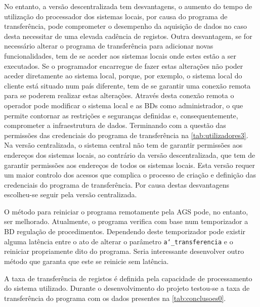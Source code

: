 \documentclass[11pt,twoside,a4paper]{report}
\begin{document}
No entanto, a versão descentralizada tem desvantagens, o aumento do tempo de utilização do processador dos sistemas locais, por causa do programa de transferência, pode comprometer o desempenho da aquisição de dados no caso desta necessitar de uma elevada cadência de registos. Outra desvantagem, se for necessário alterar o programa de transferência para adicionar novas funcionalidades, tem de se aceder aos sistemas locais onde estes estão a ser executados. Se o programador encarregue de fazer estas alterações não poder aceder diretamente ao sistema local, porque, por exemplo, o sistema local do cliente está situado num país diferente, tem de se garantir uma conexão remota para se poderem realizar estas alterações. Através desta conexão remota o operador pode modificar o sistema local e as BDs como administrador, o que permite contornar as restrições e seguranças definidas e, consequentemente, comprometer a infraestrutura de dados. Terminando com a questão das permissões das credenciais do programa de transferência na \autoref{tab:utilizadores3}. Na versão centralizada, o sistema central não tem de garantir permissões aos endereços dos sistemas locais, ao contrário da versão descentralizada, que tem de garantir permissões aos endereços de todos os sistemas locais. Esta versão requer um maior controlo dos acessos que complica o processo de criação e definição das credenciais do programa de transferência. Por causa destas desvantagens escolheu-se seguir pela versão centralizada.\par 
O método para reiniciar o programa remotamente pela AGS pode, no entanto, ser melhorado. Atualmente, o programa verifica com base num temporizador a BD regulação de procedimentos. Dependendo deste temporizador pode existir alguma latência entre o ato de alterar o parâmetro \texttt{a\char`_transferencia} e o reiniciar propriamente dito do programa. Seria interessante desenvolver outro método que garanta que este se reinicie sem latência.\par 
A taxa de transferência de registos é definida pela capacidade de processamento do sistema utilizado. Durante o desenvolvimento do projeto testou-se a taxa de transferência do programa com os dados presentes na \autoref{tab:conclusoes0}.
\end{document}
